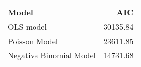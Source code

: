 \begin{table}[ht]
\centering
\begin{tabular}{lr}
  \hline
Model & AIC \\ 
  \hline
OLS model & 30135.84 \\ 
  Poisson Model & 23611.85 \\ 
  Negative Binomial Model & 14731.68 \\ 
   \hline
\end{tabular}
\end{table}
